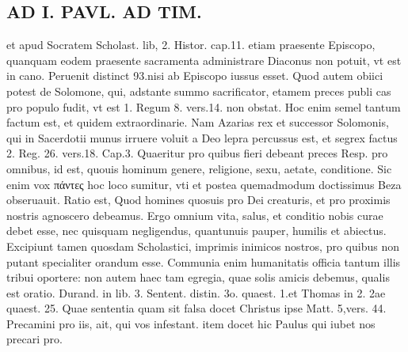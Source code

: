 \documentclass{article}
\begin{document}
\begin{pages}
\section*{AD I. PAVL. AD TIM. }
\marginpar{[ p.44 ]}\pstart et apud Socratem Scholast. lib, 2. Histor. cap.11. etiam praesente Episcopo, quanquam eodem praesente sacramenta administrare Diaconus non potuit, vt est in cano. Peruenit distinct 93.nisi ab Episcopo iussus esset. Quod autem obiici potest de Solomone, qui, adstante summo sacrificator, etamem preces publi cas pro populo fudit, vt est 1. Regum 8. vers.14. non obstat. Hoc enim semel tantum factum est, et quidem extraordinarie. Nam Azarias rex et successor Solomonis, qui in Sacerdotii munus irruere voluit a Deo lepra percussus est, et segrex factus 2. Reg. 26. vers.18. Cap.3. Quaeritur pro quibus fieri debeant preces Resp. pro omnibus, id est, quouis hominum genere, religione, sexu, aetate, conditione. Sic enim vox πάντες hoc loco sumitur, vti et postea quemadmodum doctissimus Beza obseruauit. Ratio est, Quod homines quosuis pro Dei creaturis, et pro proximis nostris agnoscero debeamus. Ergo omnium vita, salus, et conditio nobis curae debet esse, nec quisquam negligendus, quantunuis pauper, humilis et abiectus. Excipiunt tamen quosdam Scholastici, imprimis inimicos nostros, pro quibus non putant specialiter orandum esse. Communia enim humanitatis officia tantum illis tribui oportere: non autem haec tam egregia, quae solis amicis debemus, qualis est oratio. Durand. in lib. 3. Sentent. distin. 3o. quaest. 1.et Thomas in 2. 2ae quaest. 25. Quae sententia quam sit falsa docet Christus ipse Matt. 5,vers. 44. Precamini pro iis, ait, qui vos infestant. item docet hic Paulus qui iubet nos precari pro.  \pend

\end{pages}
\end{document}

